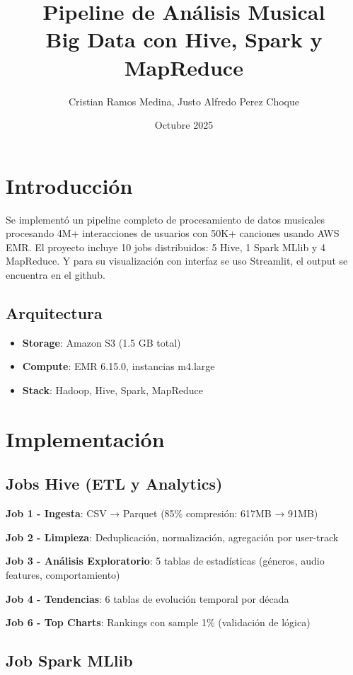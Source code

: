\documentclass[11pt,a4paper]{article}
\title{\textbf{Pipeline de Análisis Musical} \\ \large{Big Data con Hive, Spark y MapReduce}}
\author{Cristian Ramos Medina, Justo Alfredo Perez Choque}
\date{Octubre 2025}
\begin{document}
\maketitle

\section{Introducción}
Se implementó un pipeline completo de procesamiento de datos musicales procesando 4M+ interacciones de usuarios con 50K+ canciones usando AWS EMR. El proyecto incluye 10 jobs distribuidos: 5 Hive, 1 Spark MLlib y 4 MapReduce. Y para su visualización con interfaz se uso Streamlit, el output se encuentra en el github.

\subsection{Arquitectura}
\begin{itemize}
    \item \textbf{Storage}: Amazon S3 (1.5 GB total)
    \item \textbf{Compute}: EMR 6.15.0, instancias m4.large
    \item \textbf{Stack}: Hadoop, Hive, Spark, MapReduce	
\end{itemize}

\section{Implementación}

\subsection{Jobs Hive (ETL y Analytics)}

\textbf{Job 1 - Ingesta}: CSV → Parquet (85\% compresión: 617MB → 91MB)

\textbf{Job 2 - Limpieza}: Deduplicación, normalización, agregación por user-track

\textbf{Job 3 - Análisis Exploratorio}: 5 tablas de estadísticas (géneros, audio features, comportamiento)

\textbf{Job 4 - Tendencias}: 6 tablas de evolución temporal por década

\textbf{Job 6 - Top Charts}: Rankings con sample 1\% (validación de lógica)

\subsection{Job Spark MLlib}
\end{document}
